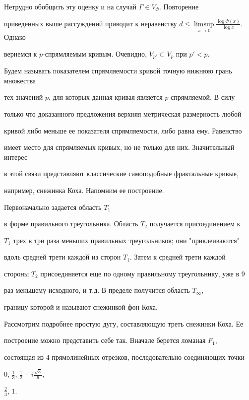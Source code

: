 Нетрудно обобщить эту оценку и на случай $\Gamma\in V_{\Phi}.$ Повторение


приведенных выше рассуждений приводит к неравенству $d\le


\limsup\limits_{x\to 0}\frac{\log\Phi (x)}{\log x}$. Однако


вернемся к $p$-спрямляемым кривым. Очевидно, $V_{p'}\subset V_p$ при $p'<p$.


Будем называть показателем спрямляемости кривой точную нижнюю грань множества


тех значений $p$, для которых данная кривая является $p$-спрямляемой. В силу


только что доказанного предложения верхняя метрическая размерность любой


кривой либо меньше ее показателя спрямляемости, либо равна ему. Равенство


имеет место для спрямляемых кривых, но не только для них. Значительный интерес


в этой связи представляют классические самоподобные фрактальные кривые,


например, снежинка Коха. Напомним ее построение.





Первоначально задается область $T_1$


в форме правильного треугольника. Область $T_2$ получается присоединением к


$T_1$ трех в три раза меньших правильных треугольников; они "приклеиваются"


вдоль средней трети каждой из сторон $T_1$. Затем к средней трети каждой


стороны $T_2$ присоединяется еще по одному правильному треугольнику, уже в 9


раз меньшему исходного, и т.д. В пределе получится область $T_\infty$,


границу которой и называют снежинкой фон Коха.





Рассмотрим подробнее простую дугу, составляющую треть снежинки Коха. Ее


построение можно представить себе так. Вначале берется ломаная $F_1$,


состоящая из 4 прямолинейных отрезков, последовательно соединяющих точки


$0$, $\frac{1}{3}$, $\frac{1}{2} + i\frac{\sqrt{3}}{6}$,


$\frac{2}{3}$, $1$.


